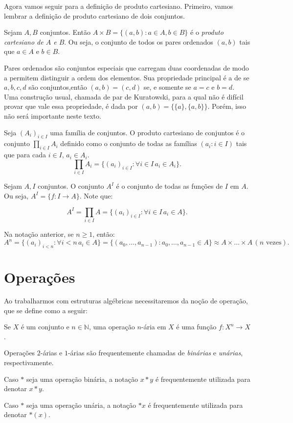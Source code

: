 Agora vamos seguir para a definição de produto cartesiano.
Primeiro, vamos lembrar a definição de produto cartesiano de dois conjuntos.

\begin{definition}
    Sejam $A, B$ conjuntos. Então $A\times B=\{(a, b): a\in A, b \in B\}$ é o \emph{produto cartesiano de $A$ e $B$}.
    Ou seja, o conjunto de todos os pares ordenados $(a, b)$ tais que $a\in A$ e $b\in B$.
\end{definition}

Pares ordenados são conjuntos especiais que carregam duas coordenadas de modo a permitem distinguir a ordem dos elementos.
Sua propriedade principal é a de se $a, b, c, d$ são conjuntos,então $(a, b)=(c, d)$ se, e somente se $a=c$ e $b=d$.
Uma construção usual, chamada de par de Kuratowski, para a qual não é difícil provar que vale essa propriedade, é dada por $(a, b)=\{\{a\}, \{a, b\}\}$. Porém, isso não será importante neste texto.


\begin{definition}
Seja $(A_i)_{i \in I}$ uma família de conjuntos.
O produto cartesiano de conjuntos é o conjunto $\prod_{i \in I} A_i$ definido como o conjunto de todas as famílias $(a_i: i \in I)$ tais que para cada $i \in I$, $a_i \in A_i$.
\[\prod_{i \in I} A_i=\{(a_i)_{i \in I}: \forall i \in I\, a_i \in A_i\}.\]
\end{definition}


\begin{definition}
    Sejam $A, I$ conjuntos.
    O conjunto $A^I$ é o conjunto de todas as funções de $I$ em $A$. Ou seja, $A^I=\{f:I\rightarrow A\}$.
    Note que:

    \[A^I=\prod_{i \in I}A=\{(a_i)_{i \in I}: \forall i \in I\,  a_i\in A\}.\]
    \end{definition}

    Na notação anterior, se $n\geq 1$, então:
    \[A^n=\{(a_i)_{i<n}:\forall i<n\, a_i \in A\}=\{(a_0, \dots, a_{n-1}):a_0, \dots, a_{n-1}\in A\}\approx A\times \dots \times A \,(n \text{ vezes}).\]

    \section{Operações}
Ao trabalharmos com estruturas algébricas necessitaremos da noção de operação, que se define como a seguir:
\begin{definition}
    Se $X$ é um conjunto e $n \in \mathbb N$, uma operação $n$-ária em $X$ é uma função $f:X^n\rightarrow X$.
\end{definition}

Operações $2$-árias e $1$-árias são frequentemente chamadas de \emph{binárias} e \emph{unárias}, respectivamente.

Caso $*$ seja uma operação binária, a notação $x*y$ é frequentemente utilizada para denotar $x*y$.

Caso $*$ seja uma operação unária, a notação $*x$ é frequentemente utilizada para denotar $*(x)$.
